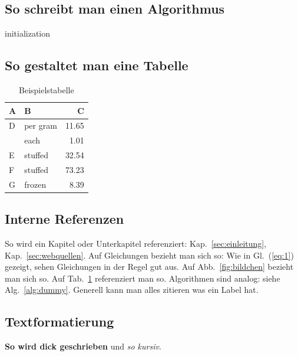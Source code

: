 \subsection{So schreibt man einen Algorithmus}

\begin{algorithm}[H]
 initialization\;
 \caption{How to write algorithms\label{alg:dummy}
 }
\end{algorithm}

\subsection{So gestaltet man eine Tabelle}

\begin{table}[H]
\caption{Beispielstabelle\label{tab:beispiel}
}
\centering
\begin{tabular}{llr}
\hline
A    & B & C \\
\hline
D      & per gram    & 11.65      \\
          & each        & 1.01       \\
E       & stuffed     & 32.54      \\
F       & stuffed     & 73.23      \\
G & frozen      & 8.39       \\
\hline
\end{tabular}
\end{table}


\subsection{Interne Referenzen}
So wird ein Kapitel oder Unterkapitel referenziert: Kap.~\ref{sec:einleitung},
Kap.~\ref{sec:webquellen}. Auf Gleichungen bezieht man sich so: Wie in Gl.~(\ref{eq:1}) gezeigt,
sehen Gleichungen in der Regel gut aus. Auf Abb.~\ref{fig:bildchen} bezieht man sich so. Auf
Tab.~\ref{tab:beispiel} referenziert man so. Algorithmen sind analog: siehe Alg.~\ref{alg:dummy}.
Generell kann man alles zitieren was ein Label hat.

\subsection{Textformatierung}
\textbf{So wird dick geschrieben} und \textit{so kursiv}.

